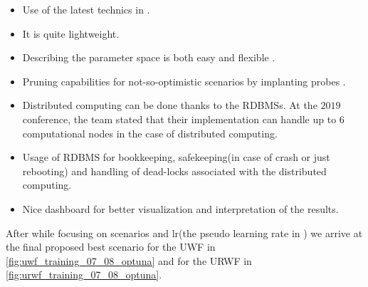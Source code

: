\begin{itemize}
  \item Use of the latest technics in \ho\cite{Hutter2019}\cite{Akiba2019}\index{\ho}.
  \item It is quite lightweight.
  \item Describing the parameter space is both easy and flexible \cite{Akiba2019}.
  \item Pruning capabilities for not-so-optimistic scenarios by implanting probes  \cite{Akiba2019}.
  \item Distributed computing can be done thanks to the \ac{RDBMS}s. At the $2019$ \scipy conference, the \optuna team stated that their implementation can handle up to $6$ computational nodes in the case of distributed computing.
  \item Usage of \ac{RDBMS} for bookkeeping, safekeeping(in case of crash or just rebooting) and handling of dead-locks associated with the distributed computing.
  \item Nice dashboard for better visualization and interpretation of the results.  
\end{itemize}
After \ho\cite{Hutter2019}\cite{Akiba2019}\index{\ho} while focusing 
on scenarios and $\mathrm{lr}$(the pseudo learning rate in \adam) we arrive at the final 
proposed best scenario for the \ac{UWF} in \cref{fig:uwf_training_07_08_optuna} and for 
the \ac{URWF} in \cref{fig:urwf_training_07_08_optuna}.
